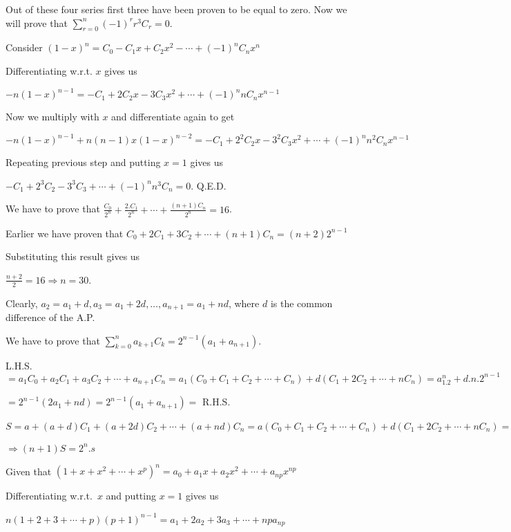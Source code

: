   Out of these four series first three have been proven to be equal to zero. Now we will prove that
  $\displaystyle\sum_{r = 0}^n(-1)^rr^3C_r = 0$.

  Consider $(1 - x)^n = C_0 - C_1x + C_2x^2 - \cdots + (-1)^nC_nx^n$

  Differentiating w.r.t. $x$ gives us

  $-n(1- x)^{n - 1} = -C_1 + 2C_2x - 3C_3x^2 + \cdots + (-1)^nnC_nx^{n - 1}$

  Now we multiply with $x$ and differentiate again to get

  $-n(1 - x)^{n - 1} + n(n - 1)x(1 - x)^{n - 2} = -C_1 + 2^2C_2x - 3^2C_3x^2 + \cdots + (-1)^nn^2C_nx^{n -
    1}$

  Repeating previous step and putting $x = 1$ gives us

  $-C_1 + 2^3C_2 - 3^3C_3 + \cdots + (-1)^nn^3C_n= 0$. Q.E.D.
\item We have to prove that $\frac{C_0}{2^n} + \frac{2.C_1}{2^n} + \cdots + \frac{(n + 1)C_n}{2^n} = 16$.

  Earlier we have proven that $C_0 + 2C_1 + 3C_2 + \cdots + (n + 1)C_n = (n + 2)2^{n - 1}$

  Substituting this result gives us

  $\frac{n + 2}{2} = 16 \Rightarrow n = 30$.
\item Clearly, $a_2 = a_1 + d, a_3 = a_1 + 2d, \ldots, a_{n + 1} = a_1 + nd$, where $d$ is the common difference
  of the A.P.

  We have to prove that $\displaystyle\sum_{k=0}^na_{k + 1}C_k = 2^{n - 1}(a_1 + a_{n +1})$.

  L.H.S.\ $= a_1C_0 + a_2C_1 + a_3C_2 + \cdots + a_{n + 1}C_n = a_1(C_0 + C_1 + C_2 + \cdots + C_n) + d(C_1
  + 2C_2 + \cdots + nC_n) = a_1.2^n + d.n.2^{n - 1}$

  $= 2^{n - 1}(2a_1 + nd) = 2^{n - 1}(a_1 + a_{n + 1}) =$ R.H.S.
\item $S = a + (a + d)C_1 +(a+ 2d)C_2 + \cdots + (a +nd)C_n = a(C_0 + C_1 + C_2 + \cdots + C_n) + d(C_1
  + 2C_2 + \cdots + nC_n) = a.2^n + d.n.2^{n - 1} = 2^{n - 1}[2a + nd] = 2^n\frac{2a + nd}{2} =
  2^n.\frac{s}{n + 1}$

  $\Rightarrow (n + 1)S = 2^n.s$
\item Given that $(1 + x + x^2 + \cdots + x^p)^n = a_0 + a_1x + a_2x^2 + \cdots + a_{np}x^{np}$

  Differentiating w.r.t.\ $x$ and putting $x = 1$ gives us

  $n(1 + 2 + 3 + \cdots + p)(p + 1)^{n - 1} = a_1 + 2a_2 + 3a_3 + \cdots + npa_{np}$

